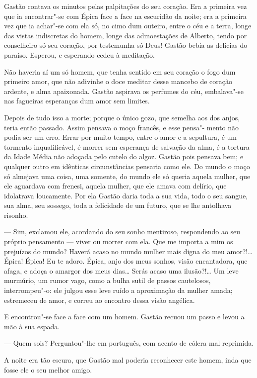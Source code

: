 Gastão contava os minutos pelas palpitações do seu coração. Era a
primeira vez que ia encontrar"-se com Épica face a face na escuridão da
noite; era a primeira vez que ia achar"-se com ela só, no cimo dum
outeiro, entre o céu e a terra, longe das vistas indiscretas do homem,
longe das admoestações de Alberto, tendo por conselheiro só seu coração,
por testemunha só Deus! Gastão bebia as delícias do paraíso. Esperou, e
esperando cedeu à meditação.

Não haveria aí um só homem, que tenha sentido em seu coração o fogo dum
primeiro amor, que não adivinhe o doce meditar desse mancebo de coração
ardente, e alma apaixonada. Gastão aspirava os perfumes do céu,
embalava"-se nas fagueiras esperanças dum amor sem limites.

Depois de tudo isso a morte; porque o único gozo, que semelha aos dos
anjos, teria então passado. Assim pensava o moço francês, e esse pensa"-
mento não podia ser um erro. Errar por muito tempo, entre o amor e a
sepultura, é um tormento inqualificável, é morrer sem esperança de
salvação da alma, é a tortura da Idade Média não adoçada pelo cutelo do
algoz. Gastão pois pensava bem; e qualquer outro em idênticas
circunstâncias pensaria como ele. Do mundo o moço só almejava uma coisa,
uma somente, do mundo ele só queria aquela mulher, que ele aguardava com
frenesi, aquela mulher, que ele amava com delírio, que idolatrava
loucamente. Por ela Gastão daria toda a sua vida, todo o seu sangue, sua
alma, seu sossego, toda a felicidade de um futuro, que se lhe antolhava
risonho.

--- Sim, exclamou ele, acordando do seu sonho mentiroso, respondendo ao
seu próprio pensamento --- viver ou morrer com ela. Que me importa a mim
os prejuízos do mundo? Haverá acaso no mundo mulher mais digna do meu
amor?!\ldots{} Épica! Épica! Eu te adoro. Épica, anjo dos meus sonhos, visão
encantadora, que afaga, e adoça o amargor dos meus dias\ldots{} Serás acaso
uma ilusão?!\ldots{} Um leve murmúrio, um rumor vago, como a bulha sutil de
passos cautelosos, interrompeu"-o: ele julgou esse leve ruído a
aproximação da mulher amada; estremeceu de amor, e correu ao encontro
dessa visão angélica.

E encontrou"-se face a face com um homem. Gastão recuou um passo e levou
a mão à sua espada.

--- Quem sois? Perguntou"-lhe em português, com acento de cólera mal
reprimida.

A noite era tão escura, que Gastão mal poderia reconhecer este homem,
inda que fosse ele o seu melhor amigo.

